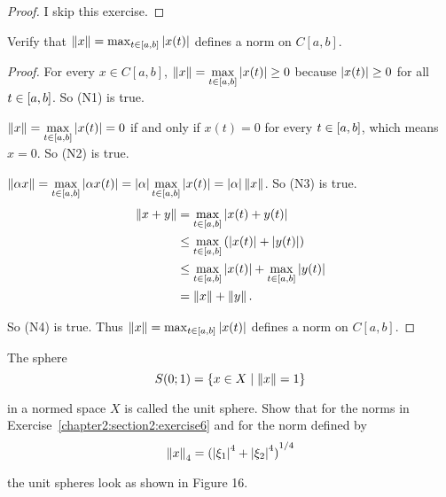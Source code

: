 \begin{proof}
    I skip this exercise.
\end{proof}

\begin{exercise}\label{chapter2:section2:exercise9}
    Verify that $\left\Vert{x}\right\Vert = \max_{t\in \left[{a, b}\right]}\left\vert{x(t)}\right\vert$ defines a norm on $C[a, b]$.
\end{exercise}

\begin{proof}
    For every $x\in C[a, b]$, $\left\Vert{x}\right\Vert = \max\limits_{t\in \left[{a,b}\right]} \left\vert{x(t)}\right\vert\geq 0$ because $\left\vert{x(t)}\right\vert\geq 0$ for all $t\in \left[{a, b}\right]$. So (N1) is true.

    $\left\Vert{x}\right\Vert = \max\limits_{t\in \left[{a,b}\right]} \left\vert{x(t)}\right\vert = 0$ if and only if $x(t) = 0$ for every $t\in \left[{a,b}\right]$, which means $x = 0$. So (N2) is true.

    $\left\Vert{\alpha x}\right\Vert = \max\limits_{t\in \left[{a,b}\right]} \left\vert{\alpha x(t)}\right\vert = \left\vert{\alpha}\right\vert\max\limits_{t\in \left[{a,b}\right]} \left\vert{x(t)}\right\vert = \left\vert{\alpha}\right\vert\left\Vert{x}\right\Vert$. So (N3) is true.
    \begin{align*}
        \left\Vert{x + y}\right\Vert & = \max\limits_{t\in \left[{a,b}\right]} \left\vert{x(t) + y(t)}\right\vert \\
                     & \leq \max\limits_{t\in \left[{a,b}\right]} \left(\left\vert{x(t)}\right\vert + \left\vert{y(t)}\right\vert\right) \\
                     & \leq \max\limits_{t\in \left[{a,b}\right]} \left\vert{x(t)}\right\vert + \max\limits_{t\in \left[{a,b}\right]} \left\vert{y(t)}\right\vert \\
                     & = \left\Vert{x}\right\Vert + \left\Vert{y}\right\Vert.
    \end{align*}

    So (N4) is true. Thus $\left\Vert{x}\right\Vert = \max_{t\in \left[{a, b}\right]}\left\vert{x(t)}\right\vert$ defines a norm on $C[a, b]$.
\end{proof}

\begin{exercise}\label{chapter2:section2:exercise10}
    The sphere
    \[ S(0; 1) = \{ x\in X \mid \left\Vert{x}\right\Vert = 1 \} \]

    in a normed space $X$ is called the unit sphere. Show that for the norms in Exercise~\ref{chapter2:section2:exercise6} and for the norm defined by
    \[
        \left\Vert{x}\right\Vert_{4} = {(\left\vert{\xi_{1}}\right\vert^{4} + \left\vert{\xi_{2}}\right\vert^{4})}^{1/4}
    \]

    the unit spheres look as shown in Figure 16.
\end{exercise}

